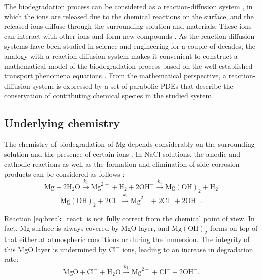 

The biodegradation process can be considered as a reaction-diffusion system \cite{wang2008}, in which the ions are released due to the chemical reactions on the surface, and the released ions diffuse through the surrounding solution and materials. These ions can interact with other ions and form new compounds \cite{Mei2020}. As the reaction-diffusion systems have been studied in science and engineering for a couple of decades, the analogy with a reaction-diffusion system makes it convenient to construct a mathematical model of the biodegradation process based on the well-established transport phenomena equations \cite{Grindrod1996}. From the mathematical perspective, a reaction-diffusion system is expressed by a set of parabolic PDEs that describe the conservation of contributing chemical species in the studied system.

\subsection{Underlying chemistry}

The chemistry of biodegradation of Mg depends considerably on the surrounding solution and the presence of certain ions \cite{Mei2020}. In NaCl solutions, the anodic and cathodic reactions as well as the formation and elimination of side corrosion products can be considered as follows \cite{Zheng2014}:
\begin{equation} \label{eq:oxidation_react}
\mathrm{Mg}+2 \mathrm{H}_{2} \mathrm{O} \stackrel{k_{1}}{\rightarrow} \mathrm{Mg}^{2+}+\mathrm{H}_{2}+2 \mathrm{OH}^{-} \stackrel{k_{1}}{\rightarrow} \mathrm{Mg}(\mathrm{OH})_{2}+\mathrm{H}_{2}
\end{equation}
\begin{equation} \label{eq:break_react}
\mathrm{Mg}(\mathrm{OH})_{2}+2 \mathrm{Cl}^{-} \stackrel{k_{2}}{\rightarrow} \mathrm{Mg}^{2+}+2 \mathrm{Cl}^{-}+2 \mathrm{OH}^{-}.
\end{equation}

Reaction \ref{eq:break_react} is not fully correct from the chemical point of view. In fact, Mg surface is always covered by MgO layer, and $\mathrm{Mg}(\mathrm{OH})_{2}$ forms on top of that either at atmospheric conditions or during the immersion. The integrity of this MgO layer is undermined by $\mathrm{Cl}^{-}$ ions, leading to an increase in degradation rate:
\begin{equation} \label{eq:break_react_mgo}
\mathrm{MgO}+ \mathrm{Cl}^{-} + \mathrm{H}_{2} \mathrm{O} \stackrel{k_{2}}{\rightarrow} \mathrm{Mg}^{2+}+ \mathrm{Cl}^{-}+ 2\mathrm{OH}^{-}.
\end{equation}

